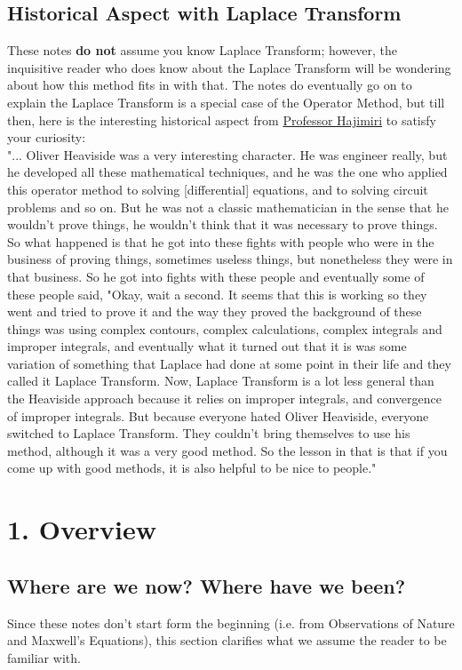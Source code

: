 \documentclass{report}
\begin{document}
\subsection*{Historical Aspect with Laplace Transform}
These notes \textbf{do not} assume you know Laplace Transform; however, the inquisitive reader who does know about the Laplace Transform will be wondering about how this method fits in with that. The notes do eventually go on to explain the Laplace Transform is a special case of the Operator Method, but till then, here is the interesting historical aspect from \href{https://youtu.be/V-DKcohQEvg}{Professor Hajimiri} to satisfy your curiosity: \smallskip \\
"... Oliver Heaviside was a very interesting character. He was engineer really, but he developed all these mathematical techniques, and he was the one who applied this operator method to solving [differential] equations, and to solving circuit problems and so on. But he was not a classic mathematician in the sense that he wouldn't prove things, he wouldn't think that it was necessary to prove things. So what happened is that he got into these fights with people who were in the business of proving things, sometimes useless things, but nonetheless they were in that business. So he got into fights with these people and eventually some of these people said, "Okay, wait a second. It seems that this is working so they went and tried to prove it and the way they proved the background of these things was using complex contours, complex calculations, complex integrals and improper integrals, and eventually what it turned out that it is was some variation of something that Laplace had done at some point in their life and they called it Laplace Transform. Now, Laplace Transform is a lot less general than the Heaviside approach because it relies on improper integrals, and convergence of improper integrals. But because everyone hated Oliver Heaviside, everyone switched to Laplace Transform. They couldn't bring themselves to use his method, although it was a very good method. So the lesson in that is that if you come up with good methods, it is also helpful to be nice to people."


\section{1. Overview}
\subsection*{Where are we now? Where have we been?}
Since these notes don't start form the beginning (i.e. from Observations of Nature and Maxwell's Equations), this section clarifies what we assume the reader to be familiar with.
\end{document}
